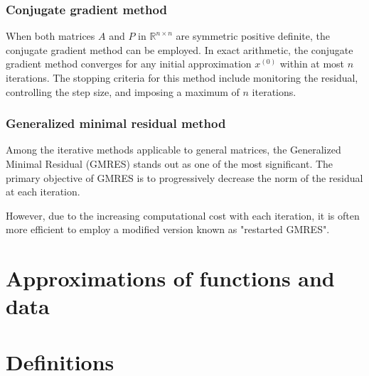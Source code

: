 \documentclass[12pt, a4paper]{report}
\begin{document}
    \subsection{Conjugate gradient method}
    When both matrices $A$ and $P$ in $\mathbb{R}^{n \times n}$ are symmetric positive definite, the conjugate gradient method can be employed.
    In exact arithmetic, the conjugate gradient method converges for any initial approximation $x^{(0)}$ within at most $n$ iterations.
    The stopping criteria for this method include monitoring the residual, controlling the step size, and imposing a maximum of $n$ iterations.

    \subsection{Generalized minimal residual method}
    Among the iterative methods applicable to general matrices, the Generalized Minimal Residual (GMRES) stands out as one of the most significant. 
    The primary objective of GMRES is to progressively decrease the norm of the residual at each iteration.
    
    However, due to the increasing computational cost with each iteration, it is often more efficient to employ a modified version known as "restarted GMRES". 

\newpage 

\chapter{Approximations of functions and data}








\newpage

\chapter{Definitions}
\end{document}
